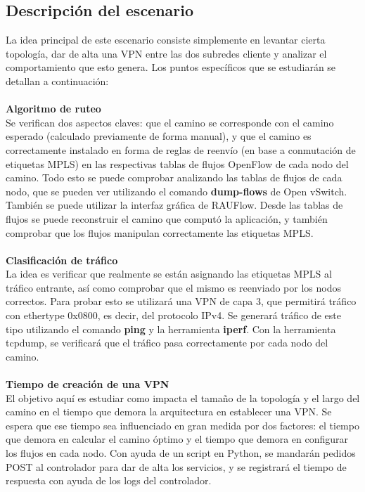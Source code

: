 \subsection{Descripción del escenario}
La idea principal de este escenario consiste simplemente en levantar cierta topología, dar de alta una VPN entre las dos subredes cliente y analizar el comportamiento que esto genera. Los puntos específicos que se estudiarán se detallan a continuación: \\ \\
\textbf{Algoritmo de ruteo} \\
 Se verifican dos aspectos claves: que el camino se corresponde con el camino esperado (calculado previamente de forma manual), y que el camino es correctamente instalado en forma de reglas de reenvío (en base a conmutación de etiquetas MPLS) en las respectivas tablas de flujos OpenFlow de cada nodo del camino. Todo esto se puede comprobar analizando las tablas de flujos de cada nodo, que se pueden ver utilizando el comando \textbf{dump-flows} de Open vSwitch. También se puede utilizar la interfaz gráfica de RAUFlow. Desde las tablas de flujos se puede reconstruir el camino que computó la aplicación, y también comprobar que los flujos manipulan correctamente las etiquetas MPLS. \\ \\
\textbf{Clasificación de tráfico} \\
La idea es verificar que realmente se están asignando las etiquetas MPLS al tráfico entrante, así como comprobar que el mismo es reenviado por los nodos correctos. Para probar esto se utilizará una VPN de capa 3, que permitirá tráfico con ethertype 0x0800, es decir, del protocolo IPv4. Se generará tráfico de este tipo utilizando el comando \textbf{ping} y la herramienta \textbf{iperf}. Con la herramienta tcpdump, se verificará que el tráfico pasa correctamente por cada nodo del camino. \\ \\
\textbf{Tiempo de creación de una VPN} \\
El objetivo aquí es estudiar como impacta el tamaño de la topología y el largo del camino en el tiempo que demora la arquitectura en establecer una VPN. Se espera que ese tiempo sea influenciado en gran medida por dos factores: el tiempo que demora en calcular el camino óptimo y el tiempo que demora en configurar los flujos en cada nodo. Con ayuda de un script en Python, se mandarán pedidos POST al controlador para dar de alta los servicios, y se registrará el tiempo de respuesta con ayuda de los logs del controlador. \\ \\
